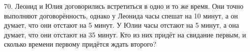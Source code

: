 70. Леонид и Юлия договорились встретиться в одно и то же время. Они точно выполняют договорённость, однако у Леонида часы спешат на 10 минут, а он думает, что они отстают на 5 минут. У Юлии часы отстают на 5 минут, а она думает, что они отстают на 35 минут. Кто из них придёт на свидание первым, и сколько времени первому придётся ждать второго?\\
